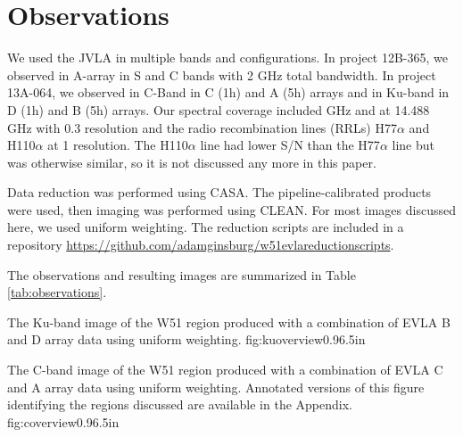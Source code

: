 \section{Observations}
We used the JVLA in multiple bands and configurations.  In project 12B-365, we
observed in A-array in S and C bands with 2 GHz total bandwidth.  In project
13A-064, we observed in C-Band in C (1h) and A (5h) arrays and in Ku-band in D
(1h) and B (5h) arrays.  Our spectral coverage included \ortho {} GHz
and \twotwo at 14.488 GHz with 0.3 \kms resolution and the radio recombination
lines (RRLs) H77$\alpha$ and H110$\alpha$ at 1 \kms resolution.  The H110$\alpha$
line had lower S/N than the H77$\alpha$ line but was otherwise similar, so it is
not discussed any more in this paper.

Data reduction was performed using CASA.  The pipeline-calibrated products were
used, then imaging was performed using CLEAN.  For most images discussed here, we
used uniform weighting.  The reduction scripts are included in a repository
\url{https://github.com/adamginsburg/w51evlareductionscripts}.

The observations and resulting images are summarized in Table
\ref{tab:observations}.




{The Ku-band image of the W51 region produced with a combination of
EVLA B and D array data using uniform weighting.}
{fig:kuoverview}{0.9}{6.5in}

{The C-band image of the W51 region produced with a combination of EVLA
C and A array data using uniform weighting.  Annotated versions of this figure
identifying the regions discussed are available in the Appendix.}
{fig:coverview}{0.9}{6.5in}

